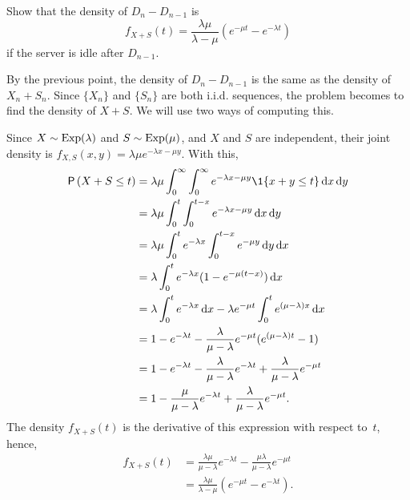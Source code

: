\begin{exercise}
Show that the density of $D_{n} - D_{n-1}$ is
    \begin{equation*}
    f_{X+S}(t) = \frac{\lambda \mu}{\lambda - \mu} (e^{-\mu t} - e^{-\lambda t})
    \end{equation*}
if the server is idle after $D_{n-1}$.
    \begin{solution}
      By the previous point, the density of $D_{n} - D_{n-1}$ is the
      same as the density of $X_n + S_n$.  Since $\{X_n\}$ and $\{S_n\}$ are both i.i.d. sequences, the problem becomes to find the density of $X+S$.  We will use two ways of computing this. 

\newpage
Since $X\sim \operatorname{Exp}(\lambda)$ and $S\sim\operatorname{Exp}(\mu)$, and $X$ and $S$ are independent, their joint density is $f_{X,S}(x,y) = \lambda \mu e^{-\lambda x - \mu y}$. With this,
  \begin{align*}
\P{X+S\leq t } 
&= \lambda \mu \int_0^\infty \int_0^\infty e^{-\lambda x - \mu y} \1{x+y\leq t} \d x \d y \\
&= \lambda \mu \int_0^t \int_0^{t-x} e^{-\lambda x - \mu y} \d x \d y \\
&= \lambda \mu \int_0^t e^{-\lambda x} \int_0^{t-x} e^{- \mu y} \d y \d x \\
&= \lambda \int_0^t e^{-\lambda x} (1-e^{- \mu (t-x)} ) \d x  \\
&= \lambda \int_0^t e^{-\lambda x}  \d x - \lambda e^{-\mu t} \int_0^t e^{(\mu-\lambda) x} \d x \\
&= 1- e^{-\lambda t} - \frac{\lambda}{\mu-\lambda} e^{-\mu t} ( e^{(\mu-\lambda) t} -1) \\
&= 1- e^{-\lambda t} - \frac{\lambda}{\mu-\lambda} e^{-\lambda t} + \frac{\lambda}{\mu-\lambda} e^{-\mu t} \\ 
&= 1 - \frac{\mu}{\mu-\lambda} e^{-\lambda t} + \frac{\lambda}{\mu-\lambda} e^{-\mu t}. \\
  \end{align*}
The density $f_{X+S}(t)$ is the derivative of this expression with respect to~$t$, hence,
\begin{align*}
  f_{X+S}(t) 
&= \frac{\lambda\mu}{\mu-\lambda} e^{-\lambda t}  - \frac{\mu \lambda}{\mu-\lambda} e^{-\mu t} \\
&= \frac{\lambda\mu}{\lambda -\mu}(e^{-\mu t} - e^{-\lambda t}). \\
\end{align*}


\end{solution}
\end{exercise}

